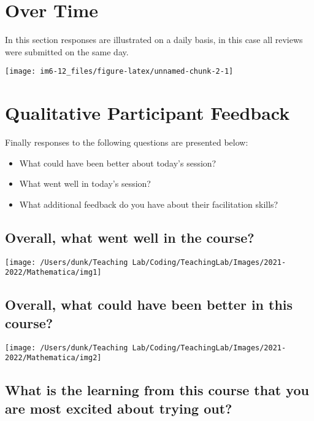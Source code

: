 \documentclass[10,a4paperpaper,]{article}
\begin{document}
\section{Over Time}

In this section responses are illustrated on a daily basis, in this case
all reviews were submitted on the same day.

\begin{center}\texttt{[image: im6-12\_files/figure-latex/unnamed-chunk-2-1]} \end{center}

\section{Qualitative Participant Feedback}

Finally responses to the following questions are presented below:

\begin{itemize}
\item
  What could have been better about today's session?
\item
  What went well in today's session?
\item
  What additional feedback do you have about their facilitation skills?
\end{itemize}

\subsection{Overall, what went well in the course?}

\begin{center}\texttt{[image: /Users/dunk/Teaching Lab/Coding/TeachingLab/Images/2021-2022/Mathematica/img1]} \end{center}

\subsection{Overall, what could have been better in this course?}

\begin{center}\texttt{[image: /Users/dunk/Teaching Lab/Coding/TeachingLab/Images/2021-2022/Mathematica/img2]} \end{center}

\subsection{What is the learning from this course that you are most excited about trying out?}
\end{document}
